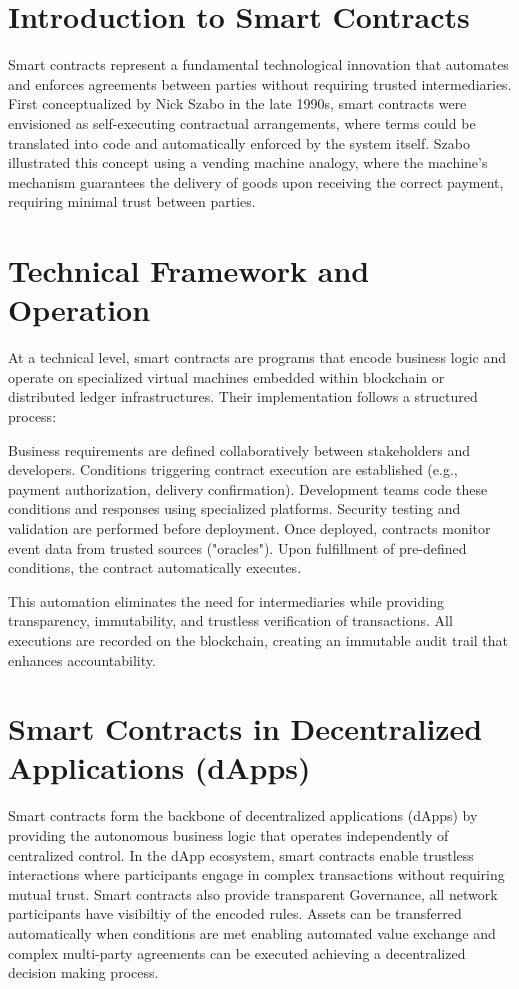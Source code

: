 \documentclass{article}
\begin{document}
\section{Introduction to Smart Contracts}

Smart contracts represent a fundamental technological innovation that automates and enforces agreements between parties without requiring trusted intermediaries. First conceptualized by Nick Szabo in the late 1990s, smart contracts were envisioned as self-executing contractual arrangements, where terms could be translated into code and automatically enforced by the system itself\cite{szabo1996smart}. Szabo illustrated this concept using a vending machine analogy, where the machine's mechanism guarantees the delivery of goods upon receiving the correct payment, requiring minimal trust between parties\cite{szabo1997formalizing}.

\section{Technical Framework and Operation}

At a technical level, smart contracts are programs that encode business logic and operate on specialized virtual machines embedded within blockchain or distributed ledger infrastructures. Their implementation follows a structured process:

Business requirements are defined collaboratively between stakeholders and developers. Conditions triggering contract execution are established (e.g., payment authorization, delivery confirmation). Development teams code these conditions and responses using specialized platforms. Security testing and validation are performed before deployment. Once deployed, contracts monitor event data from trusted sources ("oracles"). Upon fulfillment of pre-defined conditions, the contract automatically executes\cite{simplilearn2022smart}.

This automation eliminates the need for intermediaries while providing transparency, immutability, and trustless verification of transactions. All executions are recorded on the blockchain, creating an immutable audit trail that enhances accountability.

\section{Smart Contracts in Decentralized Applications (dApps)}

Smart contracts form the backbone of decentralized applications (dApps) by providing the autonomous business logic that operates independently of centralized control. In the dApp ecosystem, smart contracts enable trustless interactions where participants engage in complex transactions without requiring mutual trust. Smart contracts also provide transparent Governance, all network participants have visibiltiy of the encoded rules. Assets can be transferred automatically when conditions are met enabling automated value exchange and  complex multi-party agreements can be executed achieving a decentralized decision making process\cite{alharby2017blockchain}.
\end{document}
